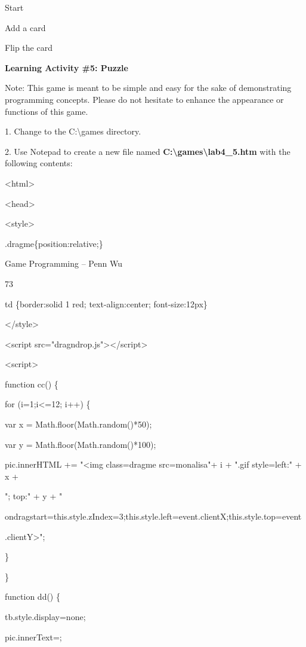 \documentclass[
]{article}
\begin{document}
Start

Add a card

Flip the card

\textbf{Learning Activity \#5: Puzzle}

Note: This game is meant to be simple and easy for the sake of
demonstrating programming concepts. Please do not hesitate to enhance
the appearance or functions of this game.

\textbf{}

1. Change to the C:\textbackslash games directory.

2. Use Notepad to create a new file named
\textbf{C:\textbackslash games\textbackslash lab4\_5.htm} with the
following contents:

\textless html\textgreater{}

\textless head\textgreater{}

\textless style\textgreater{}

.dragme\{position:relative;\}

Game Programming -- Penn Wu

73

\protect\hypertarget{index_split_005.htmlux5cux23p74}{}{}td
\{border:solid 1 red; text-align:center; font-size:12px\}

\textless/style\textgreater{}

\textless script
src="dragndrop.js"\textgreater\textless/script\textgreater{}

\textless script\textgreater{}

function cc() \{

for (i=1;i\textless=12; i++) \{

var x = Math.floor(Math.random()*50);

var y = Math.floor(Math.random()*100);

pic.innerHTML += "\textless img
class=\textquotesingle dragme\textquotesingle{} src=monalisa"+ i + ".gif
style=\textquotesingle left:" + x +

"; top:" + y + "\textquotesingle{}

ondragstart=\textquotesingle this.style.zIndex=3;this.style.left=event.clientX;this.style.top=event

.clientY\textquotesingle\textgreater";

\}

\}

function dd() \{

tb.style.display=\textquotesingle none\textquotesingle;

pic.innerText=\textquotesingle\textquotesingle;
\end{document}
